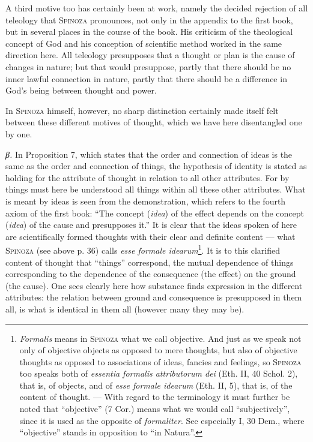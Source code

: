 \documentclass[12pt]{article}
\newcommand{\opage}[1]{\marginnote{\footnotesize\textit{[#1]}}}
\begin{document}
A third motive too has certainly been at work, namely the decided rejection of all
teleology that \textsc{Spinoza} pronounces, not only in the appendix to the first book, but
in several places in the course of the book. His criticism of the theological concept of
God and his conception of scientific method worked in the same direction here. All
teleology presupposes that a thought or plan is the cause of changes in nature; but that
\opage{40}would presuppose, partly that there should be no inner lawful connection in
nature, partly that there should be a difference in God's being between thought and power.

In \textsc{Spinoza} himself, however, no sharp distinction certainly made itself felt
between these different motives of thought, which we have here disentangled one by one.

\textit{β.} In Proposition 7, which states that the order and connection of ideas is the
same as the order and connection of things, the hypothesis of identity is stated as holding
for the attribute of thought in relation to all other attributes. For by things must here be
understood all things within all these other attributes. What is meant by ideas is seen from
the demonstration, which refers to the fourth axiom of the first book: ``The concept
(\textit{idea}) of the effect depends on the concept (\textit{idea}) of the cause and
presupposes it.'' It is clear that the ideas spoken of here are scientifically formed
thoughts with their clear and definite content --- what \textsc{Spinoza} (see above p. 36)
calls \textit{esse formale idearum}\footnote{\textit{Formalis} means in \textsc{Spinoza}
what we call objective. And just as we speak not only of objective objects as opposed to
mere thoughts, but also of objective thoughts as opposed to associations of ideas, fancies
and feelings, so \textsc{Spinoza} too speaks both of \textit{essentia formalis attributorum
dei} (Eth. II, 40 Schol. 2), that is, of objects, and of \textit{esse formale idearum}
(Eth. II, 5), that is, of the content of thought. --- With regard to the terminology it
must further be noted that ``objective'' (7 Cor.) means what we would call
``subjectively'', since it is used as the opposite of \textit{formaliter}. See especially
I, 30 Dem., where ``objective'' stands in opposition to ``in Natura''.}. It is to this
clarified content of thought that ``things'' correspond, the mutual dependence of things
corresponding to the dependence of the consequence (the effect) on the ground (the cause).
One sees clearly here how substance finds expression in the different attributes: the
relation between ground and consequence is presupposed in them all, is what is identical in
them all (however many they may be).
\end{document}
